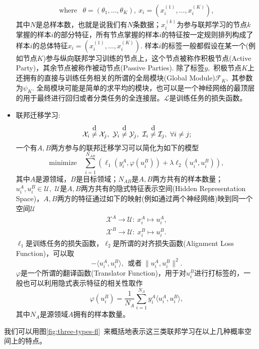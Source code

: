 \begin{itemize}
\begin{equation}
\begin{array}{cl}
\text{where} & \theta = (\theta_{1}, \ldots, \theta_{K}), ~ x_{i} = (x_{i}^{(1)}, \ldots, x_{i}^{(K)}),
\end{array}
\end{equation}
其中$N$是总样本数，也就是说我们有$N$条数据；$x_{i}^{(k)}$为参与联邦学习的节点$k$掌握的样本$i$的部分特征，所有节点掌握的样本$i$的特征按一定规则排列构成了样本$i$的总体特征$x_{i} = (x_{i}^{(1)}, \ldots, x_{i}^{(K)}).$ 样本$i$的标签一般都假设在某一个(例如节点$K$)参与纵向联邦学习训练的节点上，这个节点被称作积极节点(Active Party)，其余节点被称作被动节点(Passive Parties). 除了标签$y,$ 积极节点$K$上还拥有的直接与训练任务相关的所谓的全局模块(Global Module)$\mathcal{F}_K,$ 其参数为$\psi_K.$ 全局模块可能是简单的求平均的模块，也可以是一个神经网络的最顶层的用于最终进行回归或者分类任务的全连接层。$\mathcal{L}$是训练任务的损失函数。
\item 联邦迁移学习:
\begin{equation*}
\mathcal{X}_i \neqabove{d} \mathcal{X}_j, ~ \mathcal{Y}_i \neqabove{d} \mathcal{Y}_j, ~ \mathcal{I}_i \neqabove{d} \mathcal{I}_j, ~ \forall i \neq j;
\end{equation*}
一个有$A, B$两方参与的联邦迁移学习可以简化为如下的模型\cite{liu_2020_transfer_fl}
\begin{equation}
\label{eq:general-ftl}
\text{minimize} \quad \sum_{i=1}^{N_{AB}} \left( \ell_1(y_i^A, \varphi(u_i^B)) + \lambda \ell_2(u_i^A, u_i^B)  \right),
\end{equation}
其中$A$是源领域，$B$是目标领域；$N_{AB}$是$A, B$两方共有的样本数量；$u_i^A, u_i^B \in \mathcal{U},$ $\mathcal{U}$是$A, B$两方共有的隐式特征表示空间(Hidden Representation Space)，$A, B$两方的特征通过如下的映射(例如通过两个神经网络)映到同一个空间$\mathcal{U}$
\begin{gather*}
\mathcal{X}^A \to \mathcal{U}: ~ x_i^A \mapsto u_i^A, \\ \mathcal{X}^B \to \mathcal{U}: ~ x_i^B \mapsto u_i^B.
\end{gather*}
$\ell_1$是训练任务的损失函数，$\ell_2$是所谓的对齐损失函数(Alignment Loss Function)，可以取
\begin{equation*}
- \langle u_i^A, u_i^B \rangle, ~~ \text{或者} ~ \lVert u_i^A, u_i^B \rVert^2.
\end{equation*}
$\varphi$是一个所谓的翻译函数(Translator Function)，用于对$u_i^B$进行打标签的，一般也可以利用隐式表示特征的相关性取作
\begin{equation}
\label{eq:ftl-translator-func}
\varphi(u_i^B) = \frac{1}{N_A} \sum\limits_{i=1}^{N_A} y_i^A \langle u_i^A, u_i^B \rangle,
\end{equation}
其中$N_{A}$是源领域$A$拥有的样本数量。
\end{itemize}
我们可以用图\ref{fig:three-types-fl}~来概括地表示这三类联邦学习在以上几种概率空间上的特点。

